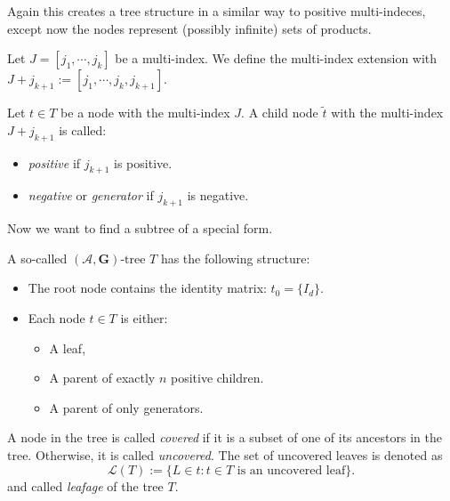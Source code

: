 Again this creates a tree structure in a similar way to positive multi-indeces, except now the nodes represent (possibly infinite) sets of products. 

\begin{definition}
    Let $J = [j_1, \cdots, j_k]$ be a multi-index. We define the multi-index extension with $J + j_{k+1} := [j_1, \cdots, j_k, j_{k+1}].$
\end{definition}

\begin{definition}
    Let $t \in T$ be a node with the multi-index $J$.
    A child node $\tilde{t}$ with the multi-index $J+j_{k+1}$ is called:
    \begin{itemize}
        \item \emph{positive} if $j_{k+1}$ is positive.
        \item \emph{negative} or \emph{generator} if $j_{k+1}$ is negative.
    \end{itemize}
\end{definition}

Now we want to find a subtree of a special form. 

\begin{definition}
    \begin{samepage}
    A so-called $(\mathcal{A},\mathbf{G})\text{-tree } T$ has the following structure: 
\begin{itemize}
    \item The root node contains the identity matrix: \( t_0 = \{I_d\} \).
    
    \item Each node \( t \in T \) is either:
    \begin{itemize}
        \item A leaf,
        \item A parent of exactly \( n \) positive children.
        \item A parent of only generators.
    \end{itemize}
\end{itemize}
\end{samepage}
\end{definition}


\begin{definition}
    A node in the tree is called \emph{covered} if it is a subset of one of its ancestors in the tree. Otherwise, it is called \emph{uncovered}. 
    The set of uncovered leaves is denoted as
\[
    \mathcal{L}(T) := \{ L \in t : t \in T \text{ is an uncovered leaf} \}.
\]
and called \emph{leafage} of the tree $T$.
\end{definition}

